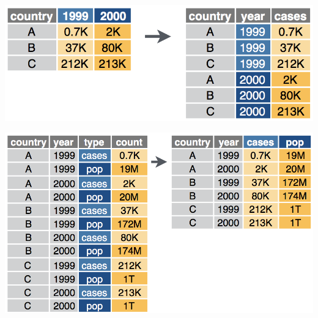 \documentclass[ignorenonframetext,]{beamer}
\begin{document}
\begin{frame}{}
\protect\hypertarget{section-1}{}

\begin{flushright}\includegraphics{pivot_longer_detailed} \end{flushright}

\begin{flushright}\includegraphics{pivot_wider_detailed} \end{flushright}

\end{frame}
\end{document}
